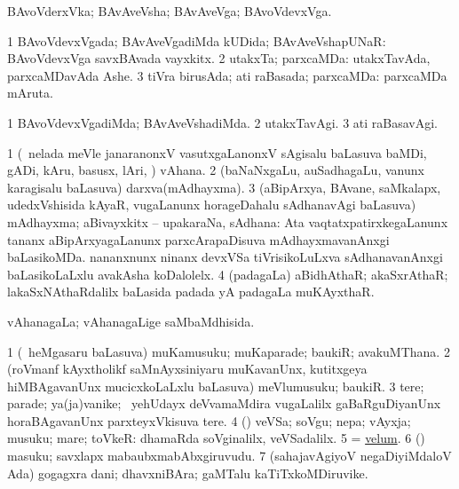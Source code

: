 \bentry
{} 
\gl{\nA}
\expl{}
\bmng
 BAvoVderxVka; BAvAveVsha; BAvAveVga; BAvoVdevxVga. 
\emng
\eentry

\bentry
{} 
\gl{\gu}
\expl{}
\bmng
\bnum
\num{1} BAvoVdevxVgada; BAvAveVgadiMda kUDida; BAvAveVshapUNaR:  BAvoVdevxVga savxBAvada vayxkitx. 
\num{2} utakxTa; parxcaMDa:  utakxTavAda, parxcaMDavAda Ashe. 
\num{3} tiVra birusAda; ati raBasada; parxcaMDa:  parxcaMDa mAruta. 
\enum
\emng
\eentry

\bentry
{} 
\gl{\kirxvi}
\expl{}
\bmng
\bnum
\num{1} BAvoVdevxVgadiMda; BAvAveVshadiMda. 
\num{2} utakxTavAgi. 
\num{3} ati raBasavAgi. 
\enum
\emng
\eentry

\bentry
{} 
\gl{\nA}
\expl{}
\bmng
\bnum
\num{1} (\kanmu\ nelada meVle janaranonxV vasutxgaLanonxV sAgisalu baLasuva baMDi, gADi, kAru, basusx, lAri, \mo) vAhana. 
\num{2} (baNaNxgaLu, auSadhagaLu, \mo vanunx karagisalu baLasuva) darxva(mAdhayxma). 
\num{3} (aBipArxya, BAvane, saMkalapx, udedxVshisida kAyaR, \mo vugaLanunx horageDahalu sAdhanavAgi baLasuva) mAdhayxma; aBivayxkitx -- upakaraNa, sAdhana:  Ata vaqtatxpatirxkegaLanunx tananx aBipArxyagaLanunx parxcArapaDisuva mAdhayxmavanAnxgi baLasikoMDa.  nananxnunx ninanx devxVSa tiVrisikoLuLxva sAdhanavanAnxgi baLasikoLaLxlu avakAsha koDalolelx. 
\num{4} (padagaLa) aBidhAthaR; akaSxrAthaR; lakaSxNAthaRdalilx baLasida padada yA padagaLa muKAyxthaR. 
\enum
\emng
\eentry

\bentry
{} 
\gl{\gu}
\expl{}
\bmng
 vAhanagaLa; vAhanagaLige saMbaMdhisida. 
\emng
\eentry

\bentry
{} 
\gl{\nA}
\expl{}
\bmng
\bnum
\num{1} (\sA\ heMgasaru baLasuva) muKamusuku; muKaparade; baukiR; avakuMThana. 
\num{2} (roVmanf kAyxtholikf saMnAyxsiniyaru muKavanUnx, kutitxgeya hiMBAgavanUnx mucicxkoLaLxlu baLasuva) meVlumusuku; baukiR. 
\num{3} tere; parade; ya(ja)vanike; \kanmu\ yehUdayx deVvamaMdira \mo vugaLalilx gaBaRguDiyanUnx horaBAgavanUnx parxteyxVkisuva tere. 
\num{4} (\rUpa) veVSa; soVgu; nepa; vAyxja; musuku; mare; toVkeR:  dhamaRda soVginalilx, veVSadalilx. 
\num{5} = \hyperlink{velum}{velum}. 
\num{6} (\CA) masuku; savxlapx mabaubxmabAbxgiruvudu. 
\num{7} (sahajavAgiyoV negaDiyiMdaloV Ada) gogagxra dani; dhavxniBAra; gaMTalu kaTiTxkoMDiruvike. 
\enum
\emng

